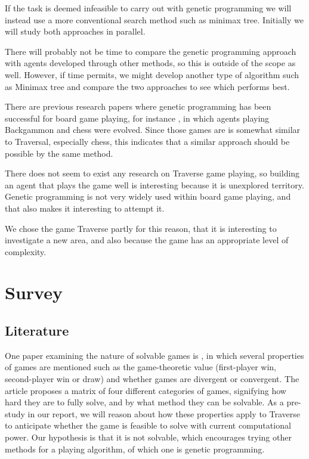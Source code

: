 \documentclass[times, 10pt,twocolumn]{article}
\begin{document}
If the task is deemed infeasible to carry out with genetic programming we will instead use a more conventional search method such as minimax tree. Initially we will study both approaches in parallel.


There will probably not be time to compare the genetic programming approach with agents developed through other methods, so this is outside of the scope as well. However, if time permits, we might develop another type of algorithm such as Minimax tree and compare the two approaches to see which performs best.


There are previous research papers where genetic programming has been successful for board game playing, for instance \cite{human-competitive_gp}, in which agents playing Backgammon and chess were evolved. Since those games are is somewhat similar to Traversal, especially chess, this indicates that a similar approach should be possible by the same method.


There does not seem to exist any research on Traverse game playing, so building an agent that plays the game well is interesting because it is unexplored territory. Genetic programming is not very widely used within board game playing, and that also makes it interesting to attempt it.

We chose the game Traverse partly for this reason, that it is interesting to investigate a new area, and also because the game has an appropriate level of complexity.

\section{Survey}

\subsection{Literature}
One paper examining the nature of solvable games is \cite{games_solved}, in which several properties of games are mentioned such as the game-theoretic value (first-player win, second-player win or draw) and whether games are divergent or convergent. The article proposes a matrix of four different categories of games, signifying how hard they are to fully solve, and by what method they can be solvable. As a pre-study in our report, we will reason about how these properties apply to Traverse to anticipate whether the game is feasible to solve with current computational power. Our hypothesis is that it is not solvable, which encourages trying other methods for a playing algorithm, of which one is genetic programming.
\end{document}
